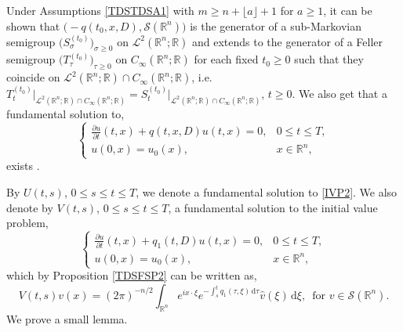 \documentclass[a4paper, 12pt]{report}
\theoremstyle{cor}
\theoremstyle{remark}
\theoremstyle{definition}
\begin{document}
Under Assumptions \ref{TDSTDSA1} with $m \ge n + \lfloor a \rfloor + 1$ for $a \ge 1$, it can be shown that $\big(-q(t_0, x, D), \mathcal{S}(\mathbb{R}^n)\big)$ is the generator of a sub-Markovian semigroup $\big(S_\sigma^{(t_0)}\big)_{\sigma \ge 0}$ on $\mathcal{L}^2(\mathbb{R}^n; \mathbb{R})$ and extends to the generator of a Feller semigroup $\big(T_\tau^{(t_0)}\big)_{\tau \ge 0}$ on $C_\infty(\mathbb{R}^n; \mathbb{R})$ for each fixed $t_0 \ge 0$ such that they coincide on $\mathcal{L}^2(\mathbb{R}^n; \mathbb{R}) \cap C_\infty(\mathbb{R}^n; \mathbb{R})$, i.e. $T_t^{(t_0)}\big|_{\mathcal{L}^2(\mathbb{R}^n; \mathbb{R}) \cap C_\infty(\mathbb{R}^n; \mathbb{R})} = S_t^{(t_0)}\big|_{\mathcal{L}^2(\mathbb{R}^n; \mathbb{R}) \cap C_\infty(\mathbb{R}^n; \mathbb{R})}$, $t \ge 0$.  We also get that a fundamental solution to,
\begin{equation}
\begin{cases}
\frac{\partial u}{\partial t}(t, x) + q(t, x, D)u(t, x) = 0, & 0 \le t \le T,\\
u(0, x) = u_0(x), & x \in \mathbb{R}^n,\label{IVP2}
\end{cases}
\end{equation}
exists \cite[Theorem 8.18]{RZ}.

By $U(t, s)$, $0 \le s \le t \le T$, we denote a fundamental solution to \eqref{IVP2}.  We also denote by $V(t, s)$, $0 \le s \le t \le T$, a fundamental solution to the initial value problem,
\begin{equation}
\begin{cases}
\frac{\partial u}{\partial t}(t, x) + q_1(t, D)u(t, x) = 0, & 0 \le t \le T,\\
u(0, x) = u_0(x), & x \in \mathbb{R}^n,\label{IVP3}
\end{cases}
\end{equation}
which by Proposition \ref{TDSFSP2} can be written as,
$$
V(t, s)v(x) = (2\pi)^{-n/2}\int_{\mathbb{R}^n}e^{ix\cdot\xi}e^{-\int_s^tq_1(\tau, \xi)\,\mathrm{d}\tau}\hat{v}(\xi)\,\mathrm{d}\xi, \,\,\, \text{for } v \in \mathcal{S}(\mathbb{R}^n).
$$
We prove a small lemma.
\end{document}

